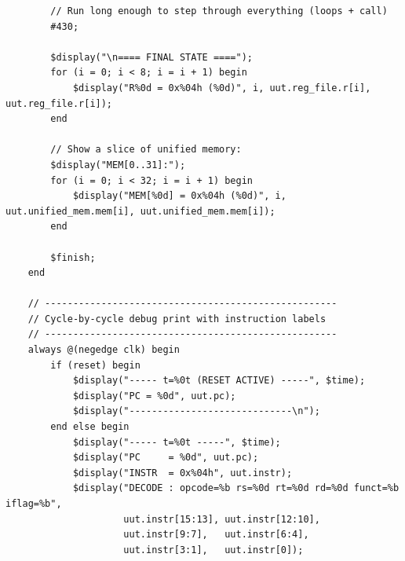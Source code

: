 \documentclass[12pt]{report}
\begin{document}
\begin{lstlisting}
        // Run long enough to step through everything (loops + call)
        #430;

        $display("\n==== FINAL STATE ====");
        for (i = 0; i < 8; i = i + 1) begin
            $display("R%0d = 0x%04h (%0d)", i, uut.reg_file.r[i], uut.reg_file.r[i]);
        end

        // Show a slice of unified memory:
        $display("MEM[0..31]:");
        for (i = 0; i < 32; i = i + 1) begin
            $display("MEM[%0d] = 0x%04h (%0d)", i, uut.unified_mem.mem[i], uut.unified_mem.mem[i]);
        end

        $finish;
    end

    // ----------------------------------------------------
    // Cycle-by-cycle debug print with instruction labels
    // ----------------------------------------------------
    always @(negedge clk) begin
        if (reset) begin
            $display("----- t=%0t (RESET ACTIVE) -----", $time);
            $display("PC = %0d", uut.pc);
            $display("-----------------------------\n");
        end else begin
            $display("----- t=%0t -----", $time);
            $display("PC     = %0d", uut.pc);
            $display("INSTR  = 0x%04h", uut.instr);
            $display("DECODE : opcode=%b rs=%0d rt=%0d rd=%0d funct=%b iflag=%b",
                     uut.instr[15:13], uut.instr[12:10],
                     uut.instr[9:7],   uut.instr[6:4],
                     uut.instr[3:1],   uut.instr[0]);


\end{lstlisting}
\end{document}
